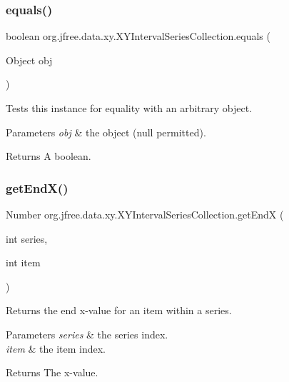 \subsubsection{\texorpdfstring{equals()}{equals()}}
{\footnotesize\ttfamily boolean org.\+jfree.\+data.\+xy.\+X\+Y\+Interval\+Series\+Collection.\+equals (\begin{DoxyParamCaption}\item[{Object}]{obj }\end{DoxyParamCaption})}

Tests this instance for equality with an arbitrary object.


\begin{DoxyParams}{Parameters}
{\em obj} & the object ({\ttfamily null} permitted).\\
\hline
\end{DoxyParams}
\begin{DoxyReturn}{Returns}
A boolean. 
\end{DoxyReturn}
\mbox{\label{classorg_1_1jfree_1_1data_1_1xy_1_1_x_y_interval_series_collection_a9e6ffe8c1b1e338f82d346ff9de9c143}} 
\subsubsection{\texorpdfstring{get\+End\+X()}{getEndX()}}
{\footnotesize\ttfamily Number org.\+jfree.\+data.\+xy.\+X\+Y\+Interval\+Series\+Collection.\+get\+EndX (\begin{DoxyParamCaption}\item[{int}]{series,  }\item[{int}]{item }\end{DoxyParamCaption})}

Returns the end x-\/value for an item within a series.


\begin{DoxyParams}{Parameters}
{\em series} & the series index. \\
\hline
{\em item} & the item index.\\
\hline
\end{DoxyParams}
\begin{DoxyReturn}{Returns}
The x-\/value. 
\end{DoxyReturn}


